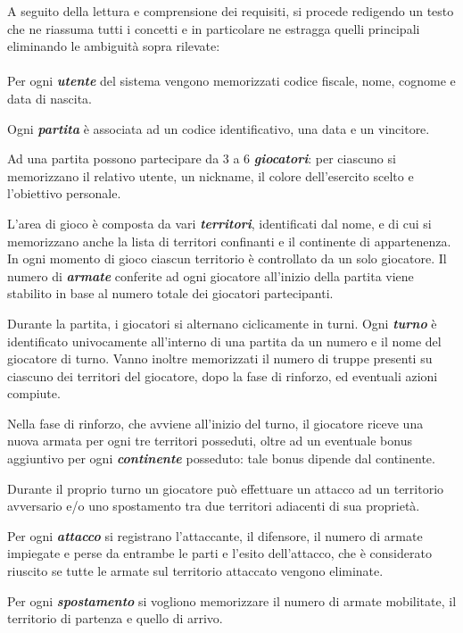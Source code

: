 \documentclass[a4paper,12pt]{report}
\begin{document}
A seguito della lettura e comprensione dei requisiti, si procede redigendo un testo che ne riassuma tutti i concetti e in particolare ne estragga quelli principali eliminando le ambiguità sopra rilevate: \\ \\
Per ogni \textbf{\textit{utente}} del sistema vengono memorizzati codice fiscale, nome, cognome e data di nascita. \par
Ogni \textbf{\textit{partita}} è associata ad un codice identificativo, una data e un vincitore. \par
Ad una partita possono partecipare da 3 a 6 \textbf{\textit{giocatori}}: per ciascuno si memorizzano il relativo utente, un nickname, il colore dell'esercito scelto e l’obiettivo personale. \par
L’area di gioco è composta da vari \textbf{\textit{territori}}, identificati dal nome, e di cui si memorizzano anche la lista di territori confinanti e il continente di appartenenza. In ogni momento di gioco ciascun territorio è controllato da un solo giocatore.
Il numero di \textbf{\textit{armate}} conferite ad ogni giocatore all’inizio della partita viene stabilito in base al numero totale dei giocatori partecipanti. \par
Durante la partita, i giocatori si alternano ciclicamente in turni. Ogni \textbf{\textit{turno}} è identificato univocamente all’interno di una partita da un numero e il nome del giocatore di turno. Vanno inoltre memorizzati il numero di truppe presenti su ciascuno dei territori del giocatore, dopo la fase di rinforzo, ed eventuali azioni compiute. \par
Nella fase di rinforzo, che avviene all’inizio del turno, il giocatore riceve una nuova armata per ogni tre territori posseduti, oltre ad un eventuale bonus aggiuntivo per ogni \textbf{\textit{continente}} posseduto: tale bonus dipende dal continente. \par
Durante il proprio turno un giocatore può effettuare un attacco ad un territorio avversario e/o uno spostamento tra due territori adiacenti di sua proprietà. \par
Per ogni \textbf{\textit{attacco}} si registrano l'attaccante, il difensore, il numero di armate impiegate e perse da entrambe le parti e l'esito dell'attacco, che è considerato riuscito se tutte le armate sul territorio attaccato vengono eliminate. \par
Per ogni \textbf{\textit{spostamento}} si vogliono memorizzare il numero di armate mobilitate, il territorio di partenza e quello di arrivo.
\end{document}
